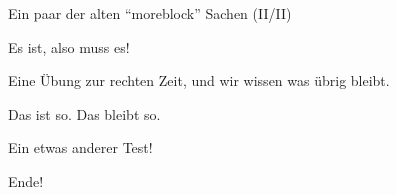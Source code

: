 \documentclass[
  ignorenonframetext,
]{beamer}
\begin{document}
\begin{frame}{Ein paar der alten \enquote{moreblock} Sachen (II/II)}
\protect\hypertarget{ein-paar-der-alten-moreblock-sachen-iiii}{}


\begin{definition}

Es ist, also muss es!

\end{definition}


\begin{Uebung}

Eine Übung zur rechten Zeit, und wir wissen was übrig bleibt.

\end{Uebung}


\begin{Fakt}

Das ist so. Das bleibt so.

\end{Fakt}


\begin{Beispiel}[\(<\) \(>\) \(\leq\)]

Ein etwas anderer Test!

\end{Beispiel}

\end{frame}

\begin{frame}{Ende!}
\protect\hypertarget{ende}{}

\end{frame}
\end{document}
